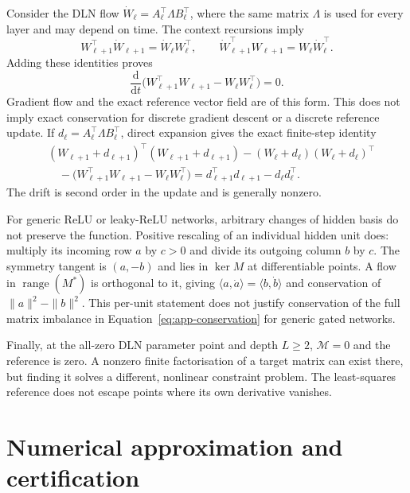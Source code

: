 \documentclass{article}
\theoremstyle{definition}
\theoremstyle{remark}
\begin{document}
Consider the DLN flow $\dot W_\ell=A_\ell^\top\Lambda B_\ell^\top$, where the same matrix $\Lambda$ is used for every layer and may depend on time. The context recursions imply
\begin{equation}
 W_{\ell+1}^\top\dot W_{\ell+1}=\dot W_\ell W_\ell^\top,
 \qquad
 \dot W_{\ell+1}^\top W_{\ell+1}=W_\ell\dot W_\ell^\top.
\end{equation}
Adding these identities proves
\begin{equation}
 \frac{\mathrm d}{\mathrm dt}
 \big(W_{\ell+1}^\top W_{\ell+1}-W_\ell W_\ell^\top\big)=0.
 \label{eq:app-conservation}
\end{equation}
Gradient flow and the exact reference vector field are of this form. This does not imply exact conservation for discrete gradient descent or a discrete reference update. If $d_\ell=A_\ell^\top\Lambda B_\ell^\top$, direct expansion gives the exact finite-step identity
\begin{equation}
 \begin{split}
 &(W_{\ell+1}+d_{\ell+1})^\top(W_{\ell+1}+d_{\ell+1})
 -(W_\ell+d_\ell)(W_\ell+d_\ell)^\top\\
 &\quad-\big(W_{\ell+1}^\top W_{\ell+1}-W_\ell W_\ell^\top\big)
 =d_{\ell+1}^\top d_{\ell+1}-d_\ell d_\ell^\top.
 \end{split}
 \label{eq:app-discrete-conservation}
\end{equation}
The drift is second order in the update and is generally nonzero.

For generic ReLU or leaky-ReLU networks, arbitrary changes of hidden basis do not preserve the function. Positive rescaling of an individual hidden unit does: multiply its incoming row $a$ by $c>0$ and divide its outgoing column $b$ by $c$. The symmetry tangent is $(a,-b)$ and lies in $\ker M$ at differentiable points. A flow in $\operatorname{range}(M^*)$ is orthogonal to it, giving $\langle a,\dot a\rangle=\langle b,\dot b\rangle$ and conservation of $\|a\|^2-\|b\|^2$. This per-unit statement does not justify conservation of the full matrix imbalance in Equation~\eqref{eq:app-conservation} for generic gated networks.

Finally, at the all-zero DLN parameter point and depth $L\ge2$, $\mathcal M=0$ and the reference is zero. A nonzero finite factorisation of a target matrix can exist there, but finding it solves a different, nonlinear constraint problem. The least-squares reference does not escape points where its own derivative vanishes.

\section{Numerical approximation and certification}
\label{app:solver}
\end{document}
